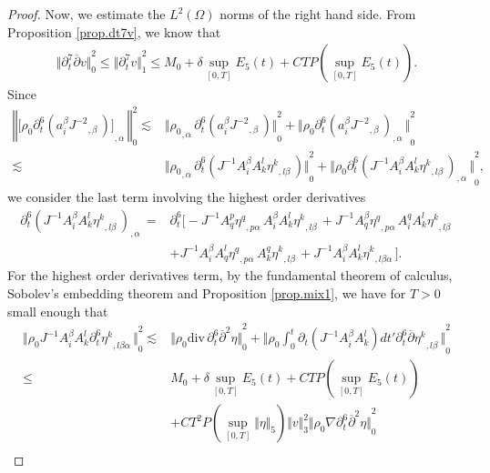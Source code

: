\documentclass[12pt,twoside,reqno]{amsart}
\numberwithin{equation}{section}
\theoremstyle{definition}
\theoremstyle{remark}
\begin{document}
\begin{proof}
Now, we estimate the $L^2(\Omega)$ norms of the right hand side. From Proposition \ref{prop.dt7v}, we know that
\begin{align*}
  {\Vert{{\partial}_t^7{\overline{\partial}} v}\Vert}_0^2{\leqslant} {\Vert{{\partial}_t^7 v}\Vert}_1^2{\leqslant} M_0+\delta \sup_{[0,T]} E_5(t)+CTP(\sup_{[0,T]}E_5(t)).
\end{align*}
Since
\begin{align*}
  {\left\Vert{{{{\Big[{\rho_0}  {\partial}_t^6(a_i^\beta{{{J^{-2}}}_{,{\beta}}\,})\Big]}}_{,{\alpha}}\,}}\right\Vert}_0^2
  \lesssim &{\Vert{{{\rho_0}_{,{\alpha}}\,}{\partial}_t^6(a_i^\beta{{{J^{-2}}}_{,{\beta}}\,})}\Vert}_0^2 +{\Vert{{\rho_0} {{{{\partial}_t^6(a_i^\beta{{{J^{-2}}}_{,{\beta}}\,})}}_{,{\alpha}}\,}}\Vert}_0^2\\
  \lesssim& {\Vert{{{\rho_0}_{,{\alpha}}\,}{\partial}_t^6(J^{-1}A_i^\beta A^l_k{{{\eta^k}}_{,{l\beta}}\,})}\Vert}_0^2 +{\Vert{{\rho_0} {{{{\partial}_t^6(J^{-1}A_i^\beta A^l_k{{{\eta^k}}_{,{l\beta}}\,})}}_{,{\alpha}}\,}}\Vert}_0^2,
\end{align*}
we consider the last term involving the highest order derivatives
\begin{align*}
  {{{{\partial}_t^6(J^{-1}A_i^\beta A^l_k{{{\eta^k}}_{,{l\beta}}\,})}}_{,{\alpha}}\,}
  =&{\partial}_t^6\big[-J^{-1}A^p_q{{{\eta^q}}_{,{p\alpha}}\,}A_i^\beta A^l_k{{{\eta^k}}_{,{l\beta}}\,}+J^{-1}A^\beta_q{{{\eta^q}}_{,{p\alpha}}\,}A^q_i A^l_k{{{\eta^k}}_{,{l\beta}}\,}\\
  &+J^{-1}A^\beta_i A^l_q{{{\eta^q}}_{,{p\alpha}}\,}A^q_k{{{\eta^k}}_{,{l\beta}}\,}+J^{-1}A_i^\beta A^l_k{{{\eta^k}}_{,{l\beta\alpha}}\,}\big].
\end{align*}
For the highest order derivatives term, by the fundamental theorem of calculus, Sobolev's embedding theorem and Proposition \ref{prop.mix1}, we have for $T>0$ small enough that
\begin{align*}
  {\Vert{{\rho_0} J^{-1}A_i^\beta A^l_k{{{{\partial}_t^6\eta^k}}_{,{l\beta\alpha}}\,}}\Vert}_0^2
  \lesssim& {\Vert{{\rho_0}  {\mathrm{div}\,} {\partial}_t^6{\overline{\partial}}^2\eta}\Vert}_0^2+{\Vert{{\rho_0}  \int_0^t {\partial}_t(J^{-1}A_i^\beta A_{k}^l)dt' {{{ {\partial}_t^6{\overline{\partial}}\eta^k}}_{,{l\beta}}\,}}\Vert}_0^2\\
  {\leqslant}& M_0+\delta \sup_{[0,T]} E_5(t)+CTP(\sup_{[0,T]}E_5(t))\\
  &+CT^2P(\sup_{[0,T]}{\Vert{\eta}\Vert}_5){\Vert{v}\Vert}_3^2 {\Vert{{\rho_0} {\nabla}{\partial}_t^6{\overline{\partial}}^2\eta}\Vert}_0^2\\

\end{align*}
\end{proof}
\end{document}

